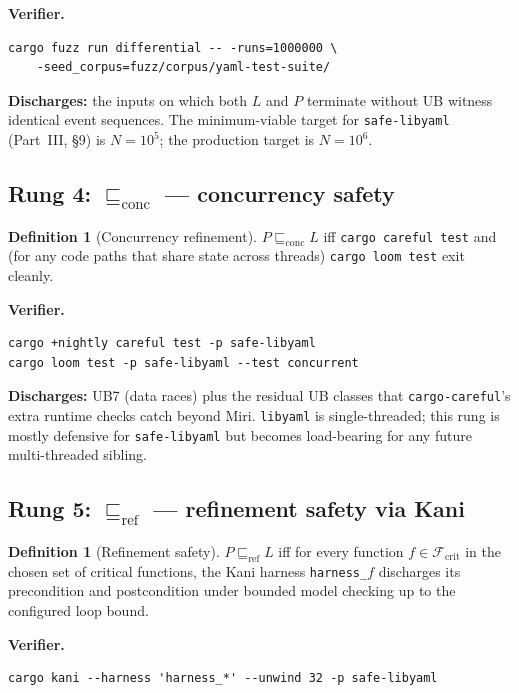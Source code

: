 \documentclass[12pt]{article}
\theoremstyle{definition}
\newtheorem{definition}[theorem]{Definition}
\theoremstyle{remark}
\newcommand{\libyaml}{\texttt{libyaml}}
\newcommand{\safelibyaml}{\texttt{safe-libyaml}}
\newcommand{\Conc}{\ensuremath{\sqsubseteq_{\!\mathrm{conc}}}}
\newcommand{\Refine}{\ensuremath{\sqsubseteq_{\!\mathrm{ref}}}}
\begin{document}
\textbf{Verifier.}
\begin{lstlisting}[style=bashstyle]
cargo fuzz run differential -- -runs=1000000 \
    -seed_corpus=fuzz/corpus/yaml-test-suite/
\end{lstlisting}

\textbf{Discharges:} the inputs on which both \(L\) and \(P\) terminate
without UB witness identical event sequences. The minimum-viable target
for \safelibyaml{} (Part~III, \S{}9) is \(N = 10^{5}\); the
production target is \(N = 10^{6}\).

\subsection{Rung 4: $\Conc$ --- concurrency safety}

\begin{definition}[Concurrency refinement]
\label{def:conc}
\(P \Conc L\) iff \texttt{cargo careful test} and (for any code paths
that share state across threads) \texttt{cargo loom test} exit cleanly.
\end{definition}

\textbf{Verifier.}
\begin{lstlisting}[style=bashstyle]
cargo +nightly careful test -p safe-libyaml
cargo loom test -p safe-libyaml --test concurrent
\end{lstlisting}

\textbf{Discharges:} UB7 (data races) plus the residual UB classes that
\texttt{cargo-careful}'s extra runtime checks catch beyond Miri.
\libyaml{} is single-threaded; this rung is mostly defensive for
\safelibyaml{} but becomes load-bearing for any future
multi-threaded sibling.

\subsection{Rung 5: $\Refine$ --- refinement safety via Kani}

\begin{definition}[Refinement safety]
\label{def:refine}
\(P \Refine L\) iff for every function \(f \in \mathcal{F}_{\mathrm{crit}}\)
in the chosen set of critical functions, the Kani harness
\texttt{harness\_$f$} discharges its precondition and postcondition
under bounded model checking up to the configured loop bound.
\end{definition}

\textbf{Verifier.}
\begin{lstlisting}[style=bashstyle]
cargo kani --harness 'harness_*' --unwind 32 -p safe-libyaml
\end{lstlisting}
\end{document}
